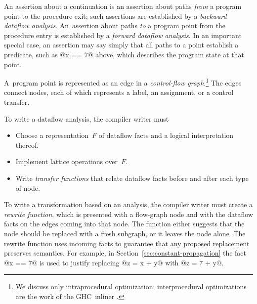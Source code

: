 \documentclass[blockstyle,preprint,natbib,nocopyrightspace]{sigplanconf}
\let\cite\citep
\newcommand{\authornote}[1]{{\em #1}}
\def\authornote#1{\unskip\relax}
\newcommand{\simon}[1]{\authornote{SLPJ: #1}}
\newcommand\secref[1]{Section~\ref{sec:#1}}
\begin{document}
An assertion about a continuation is an assertion about paths
\emph{from} a program point 
to the procedure {exit};
such assertions are established by a \emph{backward dataflow analysis}.
An~assertion about paths \emph{to} a program point from the procedure
{entry} is established by a \emph{forward dataflow analysis}.
In an important special case,
an assertion may say simply
that all paths to a point establish a predicate, such as @x == 7@
above, which describes the program 
state at that point.


A~program point is represented as an edge in
a \emph{control-flow graph}.\footnote
{We discuss only intraprocedural optimization;
interprocedural optimizations are the work of the GHC~inliner
\cite{peyton-jones:secrets-inliner}.} 
The edges connect nodes, each of which represents a label, an assignment, or
a control transfer.

\simon{Add ``Our library allows a client to do two things: (a)to write
a dataflow \emph{analysis}, which computes dataflow facts for each
program point; and (b) a \emph{transformation} based on an analysis,
which both computes dataflow facts, and transforms the program in the
light of those facts.''  Without this, it's easy for the reader to miss
the analysis vs transformation distinction.}
To write a dataflow analysis, the compiler
writer must 
\begin{itemize}
\item
Choose a representation~$F$ of dataflow facts and a logical interpretation
thereof.
\item
Implement lattice operations over~$F$.
\item
Write \emph{transfer functions} that relate dataflow facts before and
after each type of node.
\simon{I'd italicise key words from all three bullets, or none.}
\end{itemize}

To write a transformation 
\simon{Italicise ``transformation''; it is easily missed.
Dually ``analysis'' above.}
based on an analysis, the compiler writer
must \simon{additionally}
create a \emph{rewrite function}, which is presented with a
flow-graph node and with the dataflow facts on the edges coming
into that node.
The function either suggests that the node should be replaced with a
fresh subgraph, or it leaves the node alone.
The rewrite function uses incoming facts to guarantee that
any proposed replacement preserves semantics.
For example, in \secref{constant-propagation} the fact @x == 7@ is
used to justify replacing @z = x + y@ with @z = 7 + y@.
\end{document}

